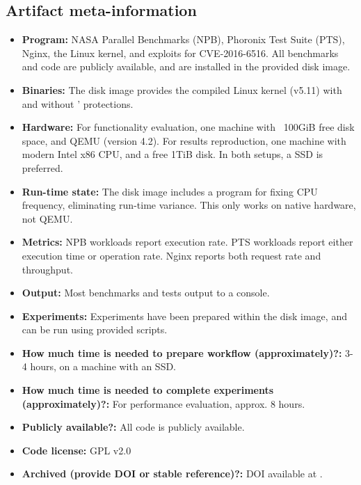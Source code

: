 \subsection{Artifact meta-information}



\begin{itemize}
  \item {\bf Program: } NASA Parallel Benchmarks (NPB), 
    Phoronix Test Suite (PTS), Nginx, the Linux kernel, and exploits for 
    CVE-2016-6516. 
    All benchmarks and code are publicly available, and are installed 
    in the provided disk image.
  \item {\bf Binaries: } The disk image provides the compiled Linux kernel (v5.11)
    with and without \midas{}' protections.
  \item {\bf Hardware: } 
    For functionality evaluation, one machine with ~100GiB free disk 
    space, and QEMU (version 4.2).
    For results reproduction, one machine with modern Intel x86 CPU, and 
    a free 1TiB disk.
    In both setups, a SSD is preferred.
  \item {\bf Run-time state: } The disk image includes a program for fixing
    CPU frequency, eliminating run-time variance. This only works on native 
    hardware, not QEMU.
  \item {\bf Metrics: } NPB workloads report execution rate. PTS
    workloads report either execution time or operation rate. 
    Nginx reports both request rate and throughput.
  \item {\bf Output: } Most benchmarks and tests output to a console.
  \item {\bf Experiments: } Experiments have been prepared within the disk image,
    and can be run using provided scripts.
  \item {\bf How much time is needed to prepare workflow (approximately)?: } 
    3-4 hours, on a machine with an SSD.
  \item {\bf How much time is needed to complete experiments (approximately)?: } 
    For performance evaluation, approx. 8 hours.
  \item {\bf Publicly available?: } All code is publicly available.
  \item {\bf Code license: } GPL v2.0
  \item {\bf Archived (provide DOI or stable reference)?: } 
    DOI \zenododoi available at
    \zenodorecord.
\end{itemize}

